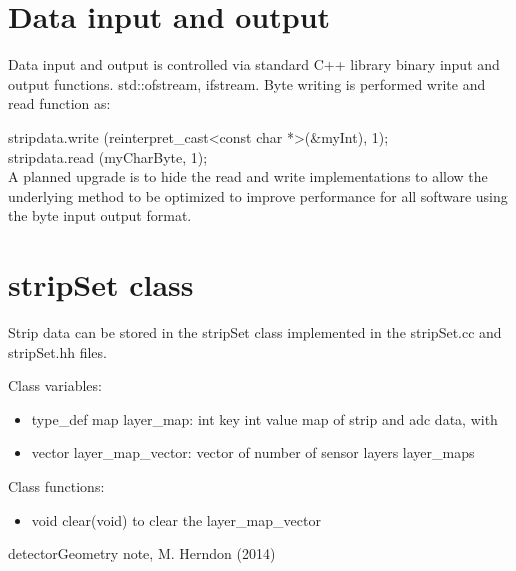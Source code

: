 \documentclass[aps,prd,superscriptaddress,floatfix]{revtex4}
\begin{document}
\section{Data input and output}
Data input and output is controlled via standard C++ library binary input and
output functions. std::ofstream, ifstream.  Byte writing is performed
write and read function as:

stripdata.write (reinterpret\_cast<const char *>(\&myInt), 1);\\
stripdata.read (myCharByte, 1);\\

A planned upgrade is to hide the read and write implementations to allow the
underlying method to be optimized to improve performance for all
software using the byte input output format.


\section{stripSet class}
Strip data can be stored in the stripSet class implemented in the
stripSet.cc and stripSet.hh files.

Class variables:
\begin{itemize}
\item type\_def map layer\_map: int key int value map of strip and adc data, with
\item vector layer\_map\_vector: vector of number of sensor layers layer\_maps
\end{itemize}

Class functions:
\begin{itemize}
\item void clear(void) to clear the layer\_map\_vector
\end{itemize}





\begin{thebibliography}{99}

detectorGeometry note, M. Herndon (2014)

\end{thebibliography}
% 
\end{document}
